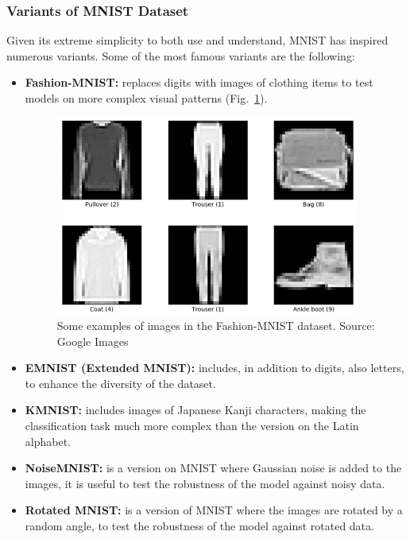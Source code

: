 \subsubsection{Variants of MNIST Dataset}
Given its extreme simplicity to both use and understand, MNIST has inspired numerous variants. Some of the most famous variants are the following:
\begin{itemize}[itemsep=0.1cm]
    \item \textbf{Fashion-MNIST:} replaces digits with images of clothing items to test models on more complex visual patterns (Fig.~\ref{fig:figure-4.1.4}).
    \begin{figure}[t]
		\centering
		\includegraphics[width=10cm]{figures/figure-4.1.4.png}
		\caption[Examples of Fashion-MNIST Images]{Some examples of images in the Fashion-MNIST dataset. Source: Google Images}
		\label{fig:figure-4.1.4}
	\end{figure}
	\item \textbf{EMNIST (Extended MNIST):} includes, in addition to digits, also letters, to enhance the diversity of the dataset.
    \item \textbf{KMNIST:} includes images of Japanese Kanji characters, making the classification task much more complex than the version on the Latin alphabet.
    \item \textbf{NoiseMNIST:} is a version on MNIST where Gaussian noise is added to the images, it is useful to test the robustness of the model against noisy data.
    \item \textbf{Rotated MNIST:} is a version of MNIST where the images are rotated by a random angle, to test the robustness of the model against rotated data.
\end{itemize}
% 
